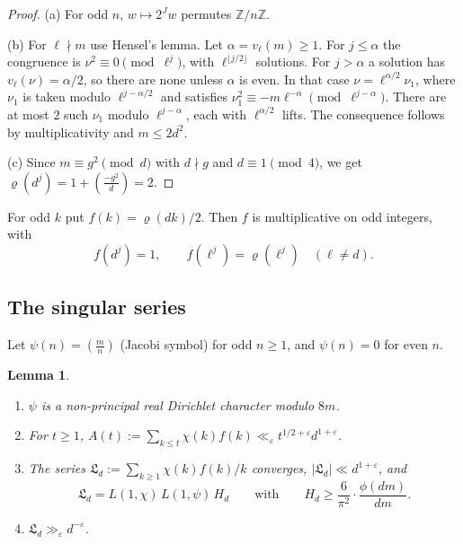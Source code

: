 \documentclass[11pt]{amsart}
\newtheorem{lemma}[theorem]{Lemma}
\theoremstyle{remark}
\theoremstyle{definition}
\numberwithin{equation}{section}
\newcommand{\Z}{\mathbb{Z}}
\newcommand{\eps}{\varepsilon}
\newcommand{\Lf}{\mathfrak{L}}
\newcommand{\leg}[2]{\left(\frac{#1}{#2}\right)}
\begin{document}
\begin{proof}
(a) For odd $n$, $w\mapsto2^Jw$ permutes $\Z/n\Z$.

(b) For $\ell\nmid m$ use Hensel's lemma. Let $\alpha=v_\ell(m)\ge1$. For $j\le\alpha$ the congruence is $\nu^2\equiv0\pmod{\ell^j}$, with $\ell^{\lfloor j/2\rfloor}$ solutions. For $j>\alpha$ a solution has $v_\ell(\nu)=\alpha/2$, so there are none unless $\alpha$ is even. In that case $\nu=\ell^{\alpha/2}\nu_1$, where $\nu_1$ is taken modulo $\ell^{j-\alpha/2}$ and satisfies $\nu_1^2\equiv-m\ell^{-\alpha}\pmod{\ell^{j-\alpha}}$. There are at most $2$ such $\nu_1$ modulo $\ell^{j-\alpha}$, each with $\ell^{\alpha/2}$ lifts. The consequence follows by multiplicativity and $m\le2d^2$.

(c) Since $m\equiv g^2\pmod d$ with $d\nmid g$ and $d\equiv1\pmod 4$, we get $\varrho(d^j)=1+\leg{-g^2}{d}=2$.
\end{proof}

For odd $k$ put $f(k)=\varrho(dk)/2$. Then $f$ is multiplicative on odd integers, with
\begin{equation}\label{eq:f}
f(d^j)=1,\qquad f(\ell^j)=\varrho(\ell^j)\quad(\ell\ne d).
\end{equation}

\subsection{The singular series}
Let $\psi(n)=\leg mn$ (Jacobi symbol) for odd $n\ge1$, and $\psi(n)=0$ for even $n$.

\begin{lemma}\label{lem:L}
\begin{enumerate}
\item[(a)] $\psi$ is a non-principal real Dirichlet character modulo $8m$.
\item[(b)] For $t\ge1$, $A(t):=\sum_{k\le t}\chi(k)f(k)\ll_\eps t^{1/2+\eps}d^{1+\eps}$.
\item[(c)] The series $\Lf_d:=\sum_{k\ge1}\chi(k)f(k)/k$ converges, $|\Lf_d|\ll d^{1+\eps}$, and
\[
\Lf_d=L(1,\chi)\,L(1,\psi)\,H_d\qquad\text{with}\qquad H_d\ge\frac{6}{\pi^2}\cdot\frac{\phi(dm)}{dm}.
\]
\item[(d)] $\Lf_d\gg_\eps d^{-\eps}$.
\end{enumerate}
\end{lemma}
\end{document}
